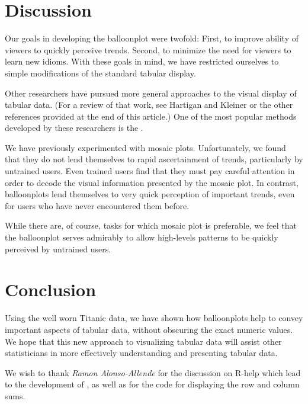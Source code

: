 \documentclass[a4paper]{report}
\begin{document}
\begin{article}
\section*{Discussion}

Our goals in developing the balloonplot were twofold: First, to
improve ability of viewers to quickly perceive trends. Second, to
minimize the need for viewers to learn new idioms.  With these goals
in mind, we have restricted ourselves to simple modifications of the
standard tabular display.  

Other researchers have pursued more general approaches to the visual
display of tabular data. (For a review of that work, see
Hartigan and Kleiner \cite{Hartigan.Kleiner.1981} or the other references provided at the
end of this article.)  One of the most popular methods developed by
these researchers is the  \cite{Snee.1974}.

We have previously experimented with mosaic plots.  Unfortunately,
we found that they do not lend themselves to rapid ascertainment of
trends, particularly by untrained users.  Even trained users find
that they must pay careful attention in order to decode the visual
information presented by the mosaic plot.  In contrast, balloonplots
lend themselves to very quick perception of important trends, even
for users who have never encountered them before.

While there are, of course, tasks for which mosaic plot is
preferable, we feel that the balloonplot serves admirably to allow
high-levels patterns to be quickly perceived by untrained users.

\section*{Conclusion}

Using the well worn Titanic data, we have shown how balloonplots
help to convey important aspects of tabular data, without obscuring
the exact numeric values.  We hope that this new approach to
visualizing tabular data will assist other statisticians in more
effectively understanding and presenting tabular data.


We wish to thank \emph{Ramon Alonso-Allende}
 for the discussion on R-help which lead
to the development of , as well as for the code
for displaying the row and column sums.

\address{Gregory R. Warnes, Pfizer Inc., USA\\
\\
       Nitin Jain, Smith Hanley Inc, USA\\
}

\end{article}
\end{document}
